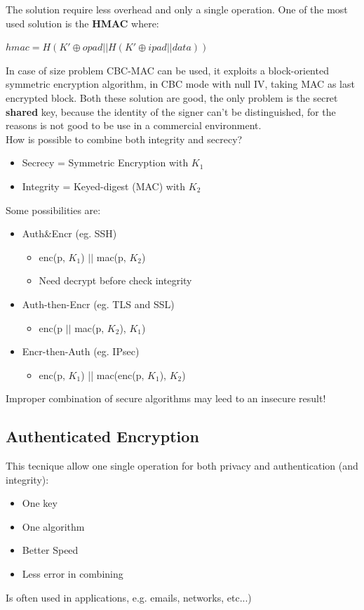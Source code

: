 \documentclass[12pt]{article}
\begin{document}
The solution require less overhead and only a single operation.
One of the most used solution is the \textbf{HMAC} where:
\begin{center}
  $hmac = H(K' \oplus opad || H(K' \oplus ipad || data))$
\end{center}
In case of size problem CBC-MAC can be used, it exploits a block-oriented symmetric encryption algorithm, in CBC mode with null IV, taking MAC as last encrypted block.
Both these solution are good, the only problem is the secret \textbf{shared} key, because the identity of the signer can't be distinguished, for the reasons is not good to be use in a commercial environment.\\
How is possible to combine both integrity and secrecy?
\begin{itemize}
  \item Secrecy = Symmetric Encryption with $K_{1}$
  \item Integrity = Keyed-digest (MAC) with $K_{2}$
\end{itemize}
Some possibilities are:
\begin{itemize}
  \item Auth\&Encr (eg. SSH)
  \begin{itemize}
    \item enc(p, $K_{1}$) $||$ mac(p, $K_{2}$)
    \item Need decrypt before check integrity
  \end{itemize}
  \item Auth-then-Encr (eg. TLS and SSL)
  \begin{itemize}
    \item enc(p $||$ mac(p, $K_{2}$), $K_{1}$)
  \end{itemize}
  \item Encr-then-Auth (eg. IPsec)
  \begin{itemize}
    \item enc(p, $K_{1}$) || mac(enc(p, $K_{1}$), $K_{2}$)
  \end{itemize}
\end{itemize}
Improper combination of secure algorithms may leed to an insecure result!

\subsection{Authenticated Encryption}
This tecnique allow one single operation for both privacy and authentication (and integrity):
\begin{itemize}
  \item One key
  \item One algorithm
  \item Better Speed
  \item Less error in combining
\end{itemize}
Is often used in applications, e.g. emails, networks, etc...)
\end{document}
